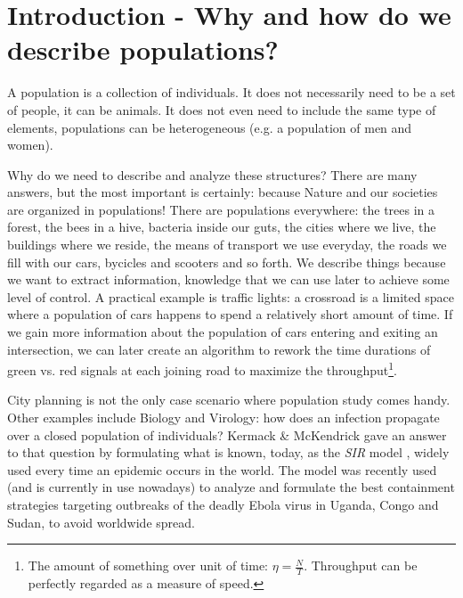 
\chapter[Introduction - Describing populations]{Introduction - Why and how do we describe populations?}
\label{ch:intro}

A population is a collection of individuals. It does not necessarily need
to be a set of people, it can be animals. It does not even need to include the
same type of elements, populations can be heterogeneous (e.g. a population
of men and women).

Why do we need to describe and analyze these structures? There are many answers,
but the most important is certainly: because Nature and our societies
are organized in populations!
There are populations everywhere:
the trees in a forest, the bees in a hive, bacteria inside our guts,
the cities where we live, the buildings where we reside,
the means of transport we use everyday, the roads we fill with our cars, bycicles and
scooters and so forth. We describe things because we want to extract information, knowledge
that we can use later to achieve some level of control. A practical example is traffic
lights: a crossroad is a limited space where a population of cars happens to spend a
relatively short amount of time.
If we gain more information about the population of cars entering and exiting an
intersection, we can later create an algorithm to rework the time durations of green vs.
red signals at each joining road to maximize the 
throughput\footnote{The amount of something over unit of time: $\eta = \frac{N}{T}$. 
Throughput can be perfectly regarded as a measure of speed.}.

City planning is not the only case scenario where population study comes handy. Other
examples include Biology and Virology: how does an infection propagate over a closed
population of individuals? Kermack \& McKendrick \cite{kermack-mckendrick}
gave an answer to that question by formulating what is known, today, as the \textit{SIR} model
\cite{kermack-mckendrick-sir}, widely used every time an epidemic occurs in the world. The
model was recently used (and is currently in use nowadays) to
analyze and formulate the best containment strategies targeting outbreaks of the
deadly Ebola virus \cite{who-ebola} in Uganda, Congo and Sudan, to avoid worldwide spread.


